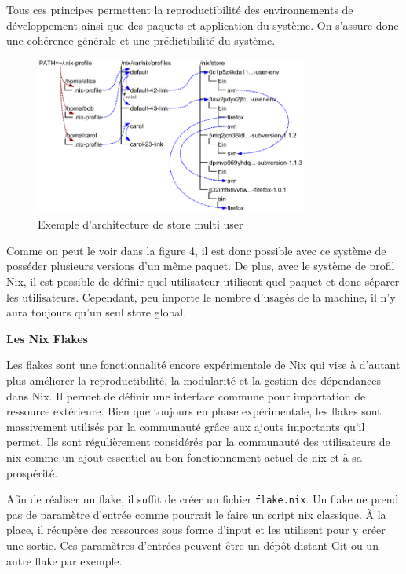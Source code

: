 \documentclass[a4paper,french,12pt, titlepage]{article}
\begin{document}
Tous ces principes permettent la reproductibilité des environnements de
développement ainsi que des paquets et application du système. On
s'assure donc une cohérence générale et une prédictibilité du
système.\newline

\begin{figure}[h]
\centering
\includegraphics[width=0.8\textwidth,height=0.8\textheight,keepaspectratio]{images/store.png}
\caption{Exemple d'architecture de store multi user}
\end{figure}

Comme on peut le voir dans la figure 4, il est donc possible avec ce
système de posséder plusieurs versions d'un même paquet. De plus, avec
le système de profil Nix, il est possible de définir quel utilisateur
utilisent quel paquet et donc séparer les utilisateurs. Cependant, peu
importe le nombre d'usagés de la machine, il n'y aura toujours qu'un
seul store global.\newline

\textbf{Les Nix Flakes}\newline

Les flakes sont une fonctionnalité encore expérimentale de Nix qui vise
à d'autant plus améliorer la reproductibilité, la modularité et la
gestion des dépendances dans Nix. Il permet de définir une interface
commune pour importation de ressource extérieure. Bien que toujours en
phase expérimentale, les flakes sont massivement utilisés par la
communauté grâce aux ajouts importants qu'il permet. Ils sont
régulièrement considérés par la communauté des utilisateurs de nix comme
un ajout essentiel au bon fonctionnement actuel de nix et à sa
prospérité.\newline

Afin de réaliser un flake, il suffit de créer un fichier
\texttt{flake.nix}. Un flake ne prend pas de paramètre d'entrée comme
pourrait le faire un script nix classique. À la place, il récupère des
ressources sous forme d'input et les utilisent pour y créer une sortie.
Ces paramètres d'entrées peuvent être un dépôt distant Git ou un autre
flake par exemple.\newline
\end{document}
